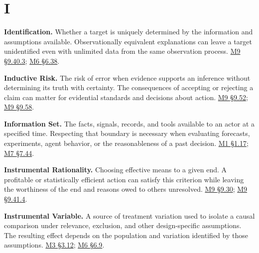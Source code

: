 \par{}
\hypertarget{module-i}{%
\section*{I}\label{module-i}}

\noindent\textbf{Identification.} Whether a target is uniquely determined by the
information and assumptions available. Observationally equivalent
explanations can leave a target unidentified even with unlimited data
from the same observation process.
\hyperref[M09-compatibility-identification-and-valuation]{M9
§9.40.3};
\href{Marketing_Analytics_Lecture_Notes.pdf\#M06-equal-historical-fit-and-different-price-effects}{M6
§6.38}.

\noindent\textbf{Inductive Risk.} The risk of error when evidence supports an
inference without determining its truth with certainty. The consequences
of accepting or rejecting a claim can matter for evidential standards
and decisions about action.
\hyperref[M09-truth-warrant-and-the-different-force-of-norms]{M9
§9.52};
\hyperref[M09-a-reasonable-principle-for-acting-under-uncertainty]{M9
§9.58}.

\noindent\textbf{Information Set.} The facts, signals, records, and tools
available to an actor at a specified time. Respecting that boundary is
necessary when evaluating forecasts, experiments, agent behavior, or the
reasonableness of a past decision.
\href{Marketing_Analytics_Lecture_Notes.pdf\#M01-information-tools-and-a-verified-analysis}{M1
§1.17};
\href{Marketing_Analytics_Lecture_Notes.pdf\#M07-available-information-and-observed-answers}{M7
§7.44}.

\noindent\textbf{Instrumental Rationality.} Choosing effective means to a given
end. A profitable or statistically efficient action can satisfy this
criterion while leaving the worthiness of the end and reasons owed to
others unresolved.
\hyperref[M09-what-a-company-ought-to-do]{M9
§9.30};
\hyperref[M09-deliberate-about-ends-before-optimizing-means]{M9
§9.41.4}.

\noindent\textbf{Instrumental Variable.} A source of treatment variation used to
isolate a causal comparison under relevance, exclusion, and other
design-specific assumptions. The resulting effect depends on the
population and variation identified by those assumptions.
\href{Marketing_Analytics_Lecture_Notes.pdf\#M03-price-elasticity-when-prices-respond-to-demand}{M3
§3.12};
\href{Marketing_Analytics_Lecture_Notes.pdf\#M06-other-designs-discontinuities-and-instruments}{M6
§6.9}.

